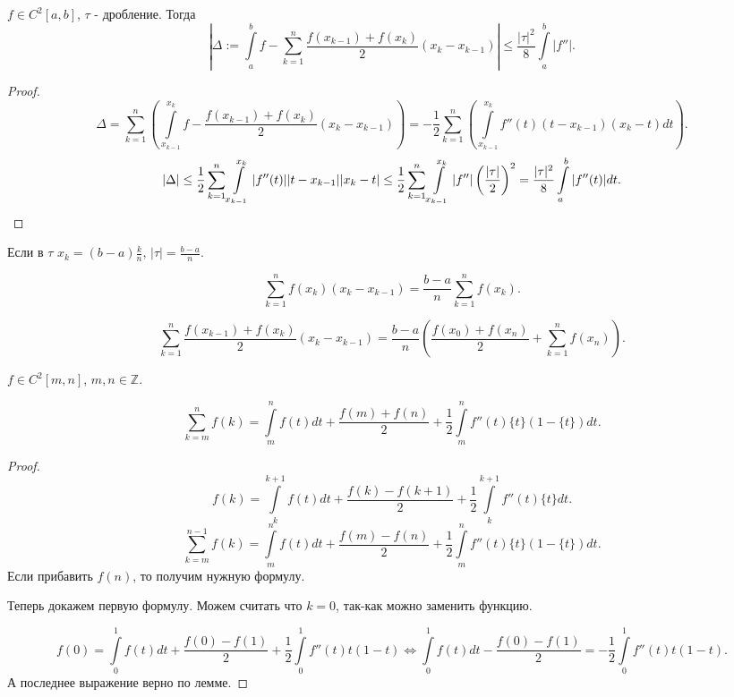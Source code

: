 \begin{theorem} 
    $f\in C^2\left[a, b\right]$, $\tau$ - дробление. Тогда 
    \[ \left|\Delta := \int\limits_{a}^{b} f - \sum\limits_{k=1}^{n} \frac{f(x_{k-1}) + f(x_{k})}{2}(x_{k}-x_{k-1})\right|   \le \frac{|\tau|^{2}}{8} \int\limits_{a}^{b} |f''| .\] 
    \begin{proof}
        \[ \Delta = \sum\limits_{k=1}^{n} \left( \int\limits_{x_{k-1}}^{x_{k}} f - \frac{f(x_{k-1}) + f(x_{k})}{2}(x_{k}-x_{k-1})    \right) = - \frac{1}{2}\sum\limits_{k=1}^{n} \left( \int\limits_{x_{k-1}}^{x_{k}} f''(t)(t-x_{k-1})(x_{k}-t)dt   \right)   .\]
        \[ |\Delta| \le \frac{1}{2} \sum\limits_{k=1}^{n} \int\limits_{x_{k-1}}^{x_{k}} |f''(t)| |t-x_{k-1}| |x_{k} - t| \le \frac{1}{2} \sum\limits_{k=1}^{n} \int\limits_{x_{k-1}}^{x_{k}} |f''| \left(\frac{|\tau|}{2}\right)^{2} = \frac{|\tau|^2}{8} \int\limits_{a}^{b} |f''(t)|dt     .\qedhere\] 
    \end{proof}
\end{theorem}
\begin{remark} 
    Если в  $\tau$ $x_{k} = (b-a) \frac{k}{n}$, $|\tau| = \frac{b-a}{n}$.

    \[ \sum\limits_{k=1}^{n} f(x_{k})(x_{k}-x_{k-1}) = \frac{b-a}{n} \sum\limits_{k=1}^{n} f(x_{k}) .\]

    \[ \sum\limits_{k=1}^{n} \frac{f(x_{k-1})+f(x_{k})}{2}(x_{k}-x_{k-1}) = \frac{b-a}{n}\left( \frac{f(x_0) + f(x_{n})}{2} + \sum\limits_{k=1}^{n} f(x_{n}) \right)  .\] 
\end{remark}
\begin{theorem} 
    $f\in C^2\left[m , n\right]$, $m,n\in \mathbb{Z}$.

    \[ \sum\limits_{k=m}^{n} f(k) = \int\limits_{m}^{n} f(t)dt + \frac{f(m) + f(n)}{2} + \frac{1}{2}\int\limits_{m}^{n} f''(t)\{t\}(1-\{t\})  dt   .\]
    \begin{proof}
        \[ f(k) = \int\limits_{k}^{k+1} f(t)dt + \frac{f(k)-f(k+1)}{2} + \frac{1}{2}\int\limits_{k}^{k+1} f''(t)\{t\}dt    .\]
        \[ \sum\limits_{k=m}^{n-1} f(k) = \int\limits_{m}^{n} f(t)dt + \frac{f(m)-f(n)}{2} + \frac{1}{2}\int\limits_{m}^{n} f''(t)\{t\}(1-\{t\})dt    .\]
        Если прибавить $f(n)$, то получим нужную формулу.

        Теперь докажем первую формулу. Можем считать что $k=0$, так-как можно заменить функцию.

        \[ f(0) = \int\limits_{0}^{1} f(t)dt + \frac{f(0) - f(1)}{2} + \frac{1}{2}\int\limits_{0}^{1} f''(t)t(1-t)  \iff  \int\limits_{0}^{1} f(t)dt - \frac{f(0)-f(1)}{2}  = -\frac{1}{2} \int\limits_{0}^{1} f''(t)t(1-t)  .\]
    А последнее выражение верно по лемме.
    \end{proof}
\end{theorem}
